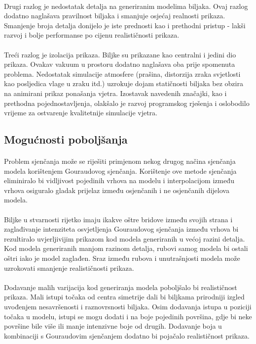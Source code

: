 \documentclass[times, utf8, diplomski]{fer}
\begin{document}
\paragraph{}
Drugi razlog je nedostatak detalja na generiranim modelima biljaka. Ovaj razlog 
dodatno naglašava pravilnost biljaka i smanjuje osjećaj realnosti prikaza.
Smanjenje broja detalja donijelo je iste prednosti kao i prethodni pristup - 
lakši razvoj i bolje performanse po cijenu realističnosti prikaza.
\paragraph{}
Treći razlog je izolacija prikaza. Biljke su prikazane kao centralni i jedini 
dio prikaza. Ovakav vakuum u prostoru dodatno naglašava oba prije spomenuta 
problema. Nedostatak simulacije atmosfere (prašina, distorzija zraka svjetlosti 
kao posljedica vlage u zraku itd.) uzrokuje dojam statičnosti biljaka bez
obzira na animirani prikaz ponašanja vjetra. Izostavak navedenih značajki, kao
i prethodna pojednostavljenja, olakšalo je razvoj programskog rješenja i 
oslobodilo vrijeme za ostvarenje kvalitetnije simulacije vjetra.

\subsection{Mogućnosti poboljšanja}
\paragraph{}
Problem sjenčanja može se riješiti primjenom nekog drugog načina sjenčanja 
modela korištenjem Gouraudovog sjenčanja. Korištenje ove metode 
sjenčanja eliminiralo bi vidljivost pojedinih vrhova na modelu i interpolacijom
između vrhova osiguralo gladak prijelaz između osjenčanih i ne osjenčanih 
dijelova modela. 
\paragraph{}
Biljke u stvarnosti rijetko imaju ikakve oštre bridove između svojih strana i 
zaglađivanje intenziteta osvjetljenja Gouraudovog sjenčanja između vrhova bi 
rezultiralo uvjerljivijim prikazom kod modela generiranih u većoj razini 
detalja. Kod modela generiranih manjom razinom detalja, rubovi samog modela bi
ostali oštri iako je model zaglađen. Sraz između rubova i unutrašnjosti modela
može uzrokovati smanjenje realističnosti prikaza.
\paragraph{}
Dodavanje malih varijacija kod generiranja modela poboljšalo bi realističnost 
prikaza. Mali istupi točaka od centra simetrije dali bi biljkama prirodniji
izgled uvođenjem nesavršenosti i raznovrsnosti biljaka. Osim dodavanja istupa
u poziciji točaka u modelu, istupi se mogu dodati i na boje pojedinih površina,
gdje bi neke površine bile više ili manje intenzivne boje od drugih. Dodavanje
boja u kombinaciji s Gouraudovim sjenčanjem dodatno bi pojačalo realističnost
prikaza.
\end{document}
